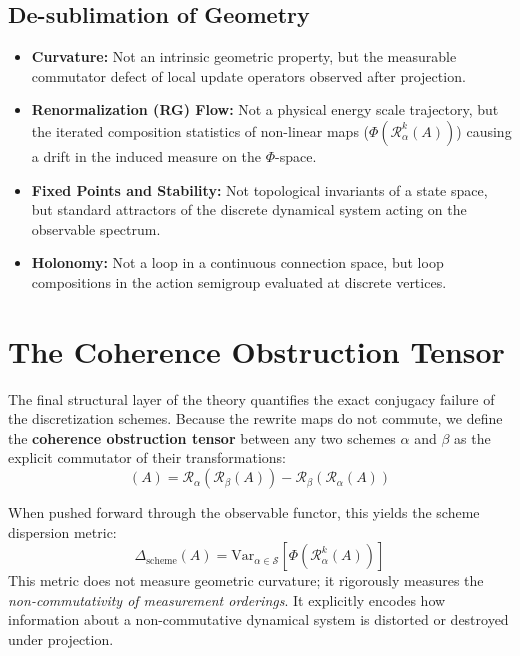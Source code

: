 \documentclass[11pt,a4paper]{article}
\begin{document}
\subsection{De-sublimation of Geometry}
\begin{itemize}
    \item \textbf{Curvature:} Not an intrinsic geometric property, but the measurable commutator defect of local update operators observed after projection.
    \item \textbf{Renormalization (RG) Flow:} Not a physical energy scale trajectory, but the iterated composition statistics of non-linear maps ($\Phi(\mathcal{R}_\alpha^k(A))$) causing a drift in the induced measure on the $\Phi$-space.
    \item \textbf{Fixed Points and Stability:} Not topological invariants of a state space, but standard attractors of the discrete dynamical system acting on the observable spectrum.
    \item \textbf{Holonomy:} Not a loop in a continuous connection space, but loop compositions in the action semigroup evaluated at discrete vertices.
\end{itemize}

\section{The Coherence Obstruction Tensor}

The final structural layer of the theory quantifies the exact conjugacy failure of the discretization schemes. Because the rewrite maps do not commute, we define the \textbf{coherence obstruction tensor} between any two schemes $\alpha$ and $\beta$ as the explicit commutator of their transformations:
\begin{equation}
    [\mathcal{R}_\alpha, \mathcal{R}_\beta](A) = \mathcal{R}_\alpha(\mathcal{R}_\beta(A)) - \mathcal{R}_\beta(\mathcal{R}_\alpha(A))
\end{equation}

When pushed forward through the observable functor, this yields the scheme dispersion metric:
\begin{equation}
    \Delta_{\text{scheme}}(A) = \mathrm{Var}_{\alpha \in \mathcal{S}} \left[ \Phi(\mathcal{R}_\alpha^k(A)) \right]
\end{equation}
This metric does not measure geometric curvature; it rigorously measures the \textit{non-commutativity of measurement orderings}. It explicitly encodes how information about a non-commutative dynamical system is distorted or destroyed under projection.
\end{document}
